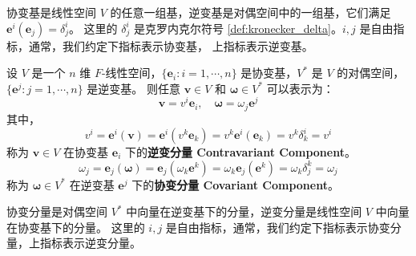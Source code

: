 \begin{note}
    协变基是线性空间 $V$ 的任意一组基，逆变基是对偶空间中的一组基，它们满足 $\mathbf{e}^i(\mathbf{e}_j) = \delta^i_j$。
    这里的 $\delta^i_j$ 是克罗内克尔符号 \ref{def:kronecker_delta}。$i,j$ 是自由指标，通常，我们约定下指标表示协变基， 上指标表示逆变基。
\end{note}
\vspace{1em}

\begin{definition}
    设 $V$ 是一个 $n$ 维 $F$-线性空间，$\{\mathbf{e}_i:i=1,\cdots,n\}$ 是协变基，$V^*$ 是 $V$ 的对偶空间，$\{\mathbf{e}^j:j=1,\cdots,n\}$ 是逆变基。
    则任意 $\mathbf{v}\in V$ 和 $\bm{\omega}\in V^*$ 可以表示为：
    \[
        \mathbf{v} = v^i \mathbf{e}_i,\quad \bm{\omega} = \omega_j \mathbf{e}^j
    \]
    其中，
    \[
        v^i = \mathbf{e}^i(\mathbf{v}) = \mathbf{e}^i(v^k \mathbf{e}_k) = v^k \mathbf{e}^i(\mathbf{e}_k) = v^k \delta^i_k = v^i
    \]
    称为 $\mathbf{v}\in V$ 在协变基 $\mathbf{e}_i$ 下的\textbf{逆变分量 Contravariant Component}。
    \[
        \omega_j = \mathbf{e}_j(\bm\omega) = \mathbf{e}_j(\omega_k \mathbf{e}^k) = \omega_k \mathbf{e}_j(\mathbf{e}^k) = \omega_k \delta_j^k = \omega_j
    \]
    称为 $\bm{\omega}\in V^*$ 在逆变基 $\mathbf{e}^j$ 下的\textbf{协变分量 Covariant Component}。
    \label{def:covariant_contravariant_components}
\end{definition}

\begin{note}
    协变分量是对偶空间 $V^*$ 中向量在逆变基下的分量，逆变分量是线性空间 $V$ 中向量在协变基下的分量。
    这里的 $i,j$ 是自由指标，通常，我们约定下指标表示协变分量，上指标表示逆变分量。
\end{note}
\vspace{1em}

